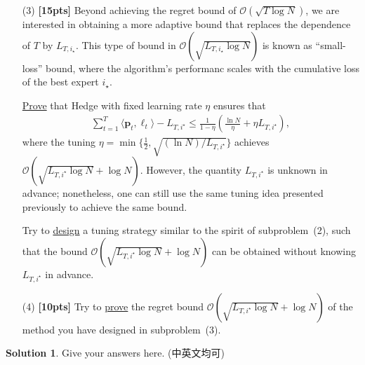\documentclass[a4paper]{article}
\numberwithin{equation}{section}
\theoremstyle{definition}
\newtheorem*{solution}{Solution}
\theoremstyle{definition}
\def \O {\mathcal{O}}
\begin{document}
\begin{enumerate}
  \item[(3)] \textbf{[15pts]} Beyond achieving the regret bound of $\O(\sqrt{T\log N})$, we are interested in obtaining a more adaptive bound that replaces the dependence of $T$ by $L_{T, i_\star}$. This type of bound in $\O(\sqrt{L_{T, i_\star}\log N})$ is known as ``small-loss'' bound, where the algorithm's performanc scales with the cumulative loss of the best expert $i_\star$.
  
  \underline{Prove} that Hedge with fixed learning rate $\eta$ ensures that
    \begin{align*}
      \sum_{t=1}^T \langle \boldsymbol{p}_t, \boldsymbol{\ell}_t \rangle - L_{T, i^\star} \le \frac{1}{1-\eta} \left( \frac{\ln N}{\eta} + \eta L_{T, i^\star} \right),
    \end{align*}
    where the tuning $\eta=\min\{\frac{1}{2},\sqrt{(\ln N)/L_{T,i^\star}}\}$ achieves $\O(\sqrt{L_{T, i^\star}\log N} + \log N)$. However, the quantity $L_{T,i^\star}$ is unknown in advance; nonetheless, one can still use the same tuning idea presented previously to achieve the same bound.
    
    Try to \underline{design} a tuning strategy similar to the spirit of subproblem~(2), such that the bound $\O(\sqrt{L_{T, i^\star}\log N} + \log N)$ can be obtained without knowing $L_{T,i^\star}$ in advance.
    
  \item[(4)] \textbf{[10pts]} Try to \underline{prove} the regret bound $\O(\sqrt{L_{T, i^\star}\log N} + \log N)$ of the method you have designed in subproblem~(3).
\end{enumerate}
\begin{solution}
  Give your answers here. (中英文均可)
  ~\\
  ~\\
  ~\\
\end{solution}



\newpage
\end{document}

